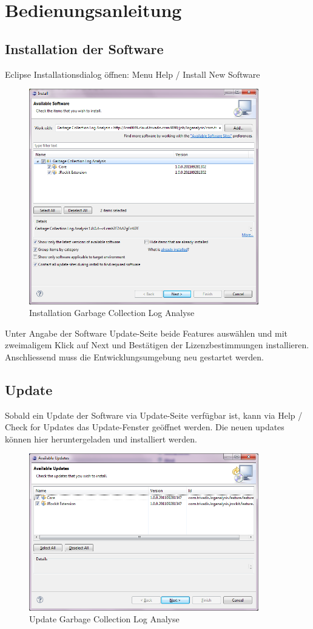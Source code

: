 \chapter{Bedienungsanleitung}\label{bedienungsanleitung}
\section{Installation der Software}
Eclipse Installationsdialog öffnen: Menu Help / Install New Software
 \begin{figure}[H]
  	\centering
    	\includegraphics[width=10cm]{images/tutorial_install01}
        	\caption{Installation Garbage Collection Log Analyse}
\end{figure}
Unter Angabe der Software Update-Seite beide Features auswählen und mit zweimaligem Klick auf Next und Bestätigen der Lizenzbestimmungen installieren. Anschliessend muss die Entwicklungsumgebung neu gestartet werden.


\section{Update}
Sobald ein Update der Software via Update-Seite verfügbar ist, kann via Help / Check for Updates das Update-Fenster geöffnet werden. Die neuen updates können hier heruntergeladen und installiert werden.
 \begin{figure}[H]
  	\centering
    	\includegraphics[width=10cm]{images/tutorial_update01}
        	\caption{Update Garbage Collection Log Analyse}
\end{figure}

